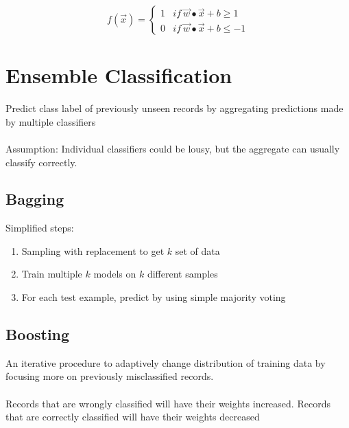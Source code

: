 $$f(\vec{x})=
\begin{cases} 
    1 & if\ \vec{w}\bullet \vec{x}+b \ge 1 \\
    0 & if\ \vec{w}\bullet \vec{x}+b \le -1 
\end{cases}
$$

\section{Ensemble Classification}
Predict class label of previously unseen records by aggregating predictions made by multiple classifiers \\ \\
Assumption: Individual classifiers could be lousy, but the aggregate can usually classify correctly.

\subsection{Bagging}
Simplified steps: 
\begin{enumerate}
\item Sampling with replacement to get $k$ set of data
\item Train multiple $k$ models on $k$ different samples
\item For each test example, predict by using simple majority voting
\end{enumerate}


\subsection{Boosting}
An iterative procedure to adaptively change distribution of training data by focusing more on previously misclassified records. \\ \\
Records that are wrongly classified will have their weights increased. Records that are correctly classified will have their weights decreased

